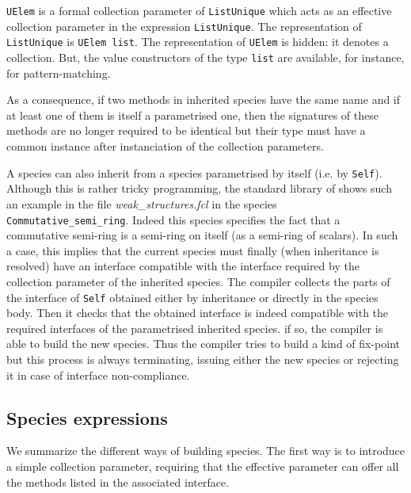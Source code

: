 {\tt UElem} is a formal collection parameter of {\tt ListUnique} which acts
as an effective collection parameter in the expression {\tt ListUnique}. The
representation of {\tt ListUnique} is {\tt UElem list}. The representation of
{\tt UElem} is hidden: it denotes a collection. But, the value constructors
of the type {\tt list} are available, for instance, for pattern-matching.

As a consequence, if two methods in inherited species have the same
name and if at least one of them is itself a parametrised one, then
the signatures of these methods are no longer required to be identical
but their type must have a common instance after instanciation of the
collection parameters.

A species can also inherit from a species parametrised by itself
(i.e. by {\tt Self}). Although this is rather tricky programming, the
standard library of {\focal} shows such an example in the file {\em
  weak\_structures.fcl} in the species {\tt
  Commutative\_semi\_ring}. Indeed this species specifies the fact
that a commutative semi-ring is a semi-ring on itself (as a semi-ring
of scalars).  In such a case, this implies that the current species
must finally (when inheritance is resolved) have an interface
compatible with the interface required by the collection parameter of
the inherited species. The {\focal} compiler collects the parts of the
interface of {\tt Self} obtained either by inheritance or directly in
the species body. Then it checks that the obtained interface is indeed
compatible with the required interfaces of the parametrised inherited
species. if so, the compiler is able to build the new species. Thus
the compiler tries to build a kind of fix-point but  this process is
always terminating, issuing either the new species or rejecting it in
case of interface non-compliance.



\subsection{Species expressions}
We summarize the different ways of building species. The first way is
to introduce a simple collection parameter, requiring that the
effective parameter can offer all the methods listed in the associated
interface.

